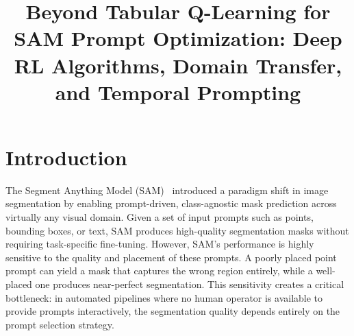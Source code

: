 \documentclass[journal, onecolumn]{IEEEtran}
\begin{document}
\title{Beyond Tabular Q-Learning for SAM Prompt Optimization: Deep RL Algorithms, Domain Transfer, and Temporal Prompting}

\author{
}

\maketitle

\section{Introduction}

The Segment Anything Model (SAM)~\cite{Kirillov2023SAM} introduced a paradigm shift in image segmentation by enabling prompt-driven, class-agnostic mask prediction across virtually any visual domain. Given a set of input prompts such as points, bounding boxes, or text, SAM produces high-quality segmentation masks without requiring task-specific fine-tuning. However, SAM's performance is highly sensitive to the quality and placement of these prompts. A poorly placed point prompt can yield a mask that captures the wrong region entirely, while a well-placed one produces near-perfect segmentation. This sensitivity creates a critical bottleneck: in automated pipelines where no human operator is available to provide prompts interactively, the segmentation quality depends entirely on the prompt selection strategy.
\end{document}
